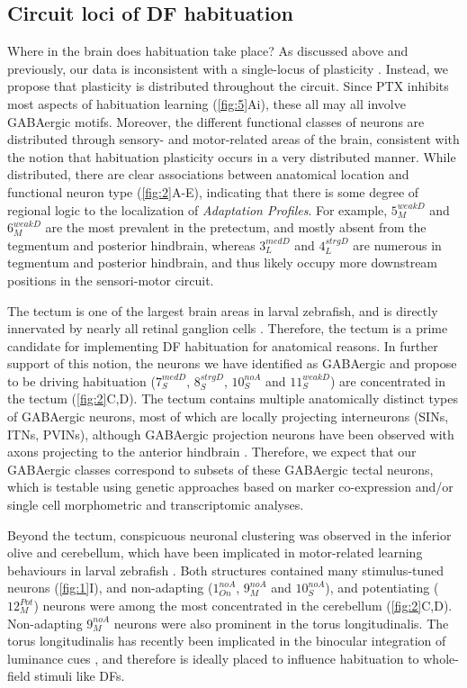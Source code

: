 \documentclass[9pt,lineno]{RandlettLab_elife}
\begin{document}
\subsection{Circuit loci of DF habituation}

Where in the brain does habituation take place?  As discussed above and previously, our data is inconsistent with a single-locus of plasticity \citep{Randlett2019-fi}. Instead, we propose that plasticity is distributed throughout the circuit. Since PTX inhibits most aspects of habituation learning (\autoref{fig:5}Ai), these all may all involve GABAergic motifs. Moreover, the different functional classes of neurons are distributed through sensory- and motor-related areas of the brain, consistent with the notion that habituation plasticity occurs in a very distributed manner. While distributed, there are clear associations between anatomical location and functional neuron type (\autoref{fig:2}A-E), indicating that there is some degree of regional logic to the localization of \emph{Adaptation Profiles}. For example, $5_{M}^{weakD}$ and $6_{M}^{weakD}$ are the most prevalent in the pretectum, and mostly absent from the tegmentum and posterior hindbrain, whereas $3_{L}^{medD}$ and $4_{L}^{strgD}$ are numerous in tegmentum and posterior hindbrain, and thus likely occupy more downstream positions in the sensori-motor circuit. 

The tectum is one of the largest brain areas in larval zebrafish, and is directly innervated by nearly all retinal ganglion cells \citep{Robles2014-kz}. Therefore, the tectum is a prime candidate for implementing DF habituation for anatomical reasons. In further support of this notion, the neurons we have identified as GABAergic and propose to be driving habituation ($7_{S}^{medD}$, $8_{S}^{strgD}$,  $10_{S}^{noA}$ and $11_{S}^{weakD}$) are concentrated in the tectum (\autoref{fig:2}C,D). The tectum contains multiple anatomically distinct types of GABAergic neurons, most of which are locally projecting interneurons (SINs, ITNs, PVINs), although GABAergic projection neurons have been observed with axons projecting to the anterior hindbrain \citep{Gebhardt2019-xd, Martin2022-iz, Nevin2010-ev, Robles2011-ty}. Therefore, we expect that our GABAergic classes correspond to subsets of these GABAergic tectal neurons, which is testable using genetic approaches based on marker co-expression and/or single cell morphometric and transcriptomic analyses.

Beyond the tectum, conspicuous neuronal clustering was observed in the inferior olive and cerebellum, which have been implicated in motor-related learning behaviours in larval zebrafish \citep{Ahrens2012-zb, Lin2020-dv, Markov2021-rd}. Both structures contained many stimulus-tuned neurons (\autoref{fig:1}I), and non-adapting ($1_{On}^{noA}$,  $9_{M}^{noA}$ and $10_{S}^{noA}$), and potentiating ($12_{M}^{Pot}$) neurons were among the most concentrated in the cerebellum (\autoref{fig:2}C,D). Non-adapting $9_{M}^{noA}$ neurons were also prominent in the torus longitudinalis. The torus longitudinalis has recently been implicated in the binocular integration of luminance cues \citep{Tesmer2022-tk}, and therefore is ideally placed to influence habituation to whole-field stimuli like DFs.
\end{document}
